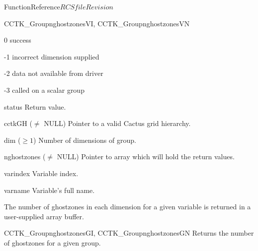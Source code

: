 \begin{cactuspart}{FunctionReference}{$RCSfile$}{$Revision$}
\begin{FunctionDescription}{CCTK\_GroupnghostzonesVI, CCTK\_GroupnghostzonesVN}
\begin{ResultSection}
\begin{Result}{\rm 0} success \end{Result}
\begin{Result}{\rm -1} incorrect dimension supplied \end{Result}
\begin{Result}{\rm -2} data not available from driver \end{Result}
\begin{Result}{\rm -3} called on a scalar group \end{Result}
\end{ResultSection}

\begin{ParameterSection}
\begin{Parameter}{status} Return value. \end{Parameter}
\begin{Parameter}{cctkGH ($\ne$ NULL)} Pointer to a valid Cactus grid hierarchy. \end{Parameter}
\begin{Parameter}{dim ($\ge 1$)} Number of dimensions of group. \end{Parameter}
\begin{Parameter}{nghostzones ($\ne$ NULL)} Pointer to array which will hold the return values. \end{Parameter}
\begin{Parameter}{varindex} Variable index. \end{Parameter}
\begin{Parameter}{varname} Variable's full name. \end{Parameter}
\end{ParameterSection}

\begin{Discussion}
The number of ghostzones in each dimension for a given variable is returned in a user-supplied array buffer.
\end{Discussion}

\begin{SeeAlsoSection}
\begin{SeeAlso}{CCTK\_GroupnghostzonesGI, CCTK\_GroupnghostzonesGN}
Returns the number of ghostzones for a given group.
\end{SeeAlso}
\end{SeeAlsoSection}

\end{FunctionDescription}



\end{cactuspart}
